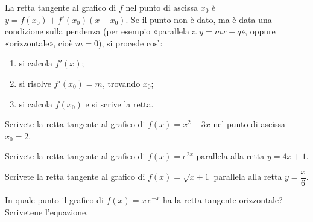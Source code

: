 \begin{vuoto}[Promemoria]{}
La retta tangente al grafico di $f$ nel punto di ascissa $x_0$ è $y=f(x_0)+f'(x_0)(x-x_0)$. Se il punto non è dato, ma è data una condizione sulla pendenza (per esempio «parallela a $y=mx+q$», oppure «orizzontale», cioè $m=0$), si procede così:
\begin{enumerate}
\item si calcola $f'(x)$;
\item si risolve $f'(x_0)=m$, trovando $x_0$;
\item si calcola $f(x_0)$ e si scrive la retta.
\end{enumerate}
\end{vuoto}

\begin{esercizio}[\liv{1}]
Scrivete la retta tangente al grafico di $f(x)=x^2-3x$ nel punto di ascissa $x_0=2$.
\end{esercizio}

\begin{esercizio}[\liv{2}]
Scrivete la retta tangente al grafico di $f(x)=e^{2x}$ parallela alla retta $y=4x+1$.
\end{esercizio}

\begin{esercizio}[\liv{2}]
Scrivete la retta tangente al grafico di $f(x)=\sqrt{x+1}$ parallela alla retta $y=\dfrac x6$.
\end{esercizio}

\begin{esercizio}[\liv{2}]
In quale punto il grafico di $f(x)=x\,e^{-x}$ ha la retta tangente orizzontale? Scrivetene l'equazione.
\end{esercizio}

